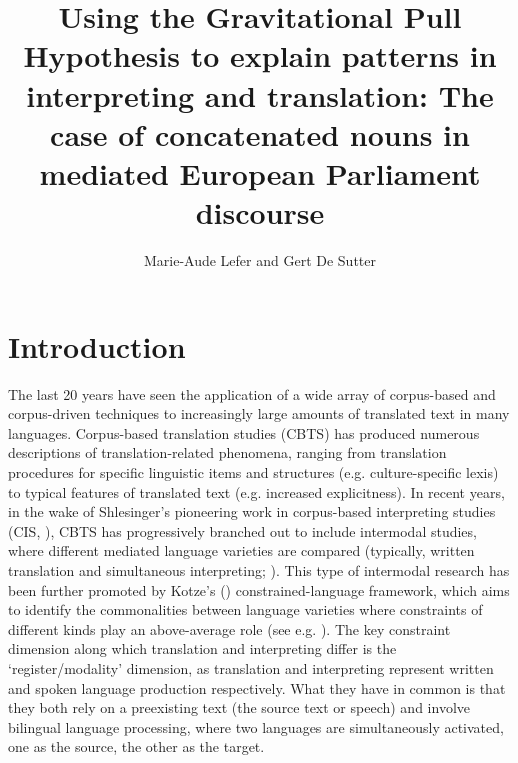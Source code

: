 \documentclass[output=paper]{langscibook}
\author{Marie-Aude Lefer\orcid{}\affiliation{Université catholique de Louvain} and Gert De Sutter\orcid{}\affiliation{Ghent University}}
\title[Gravitational Pull Hypothesis explains interpreting and translation patterns]{Using the Gravitational Pull Hypothesis to explain patterns in interpreting and translation: The case of concatenated nouns in mediated European Parliament discourse}
\begin{document}
\maketitle


\section{Introduction}

The last 20 years have seen the application of a wide array of corpus-based and corpus-driven techniques to increasingly large amounts of translated text in many languages. Corpus-based translation studies (CBTS) has produced numerous descriptions of translation-related phenomena, ranging from translation procedures for specific linguistic items and structures (e.g. culture-specific lexis) to typical features of translated text (e.g. increased explicitness). In recent years, in the wake of Shlesinger’s pioneering work in corpus-based interpreting studies (CIS, \citealt{Shlesinger1998}), CBTS has progressively branched out to include intermodal studies, where different mediated language varieties are compared (typically, written translation and simultaneous interpreting; \citealt[cf.][]{BernardiniEtAl2016}). This type of intermodal research has been further promoted by Kotze's (\citeyear{Kotze2020}) constrained-language framework, which aims to identify the commonalities between language varieties where constraints of different kinds play an above-average role (see e.g. \citealt{Kajzer-WietrznyIvaska2020}). The key constraint dimension along which translation and interpreting differ is the ‘register/modality’ dimension, as translation and interpreting represent written and spoken language production respectively. What they have in common is that they both rely on a preexisting text (the source text or speech) and involve bilingual language processing, where two languages are simultaneously activated, one as the source, the other as the target.
\end{document}
